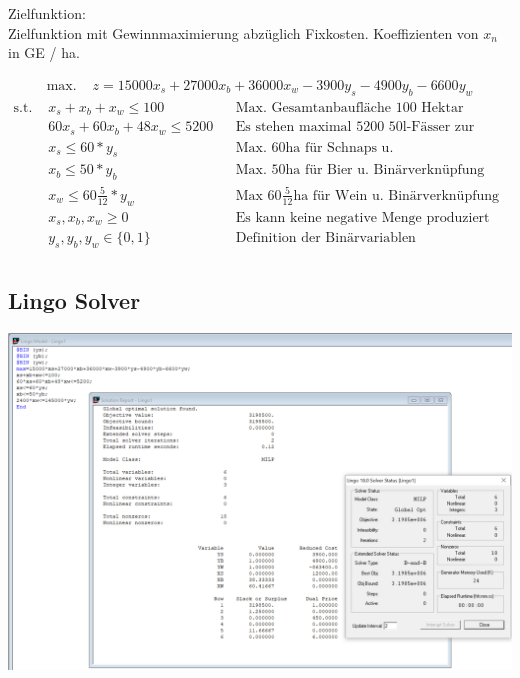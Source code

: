 \documentclass[a4paper,11pt]{article}
\begin{document}
\bigbreak
Zielfunktion: \\
Zielfunktion mit Gewinnmaximierung abzüglich Fixkosten. Koeffizienten von $x_n$ in GE / ha.

\begin{align*}
    \text{max. } & z = 15000x_{s} + 27000x_{b} + 36000x_{w} - 3900y_{s} - 4900y_{b} - 6600y_{w}
\end{align*}
\begin{align*}
    \text{s.t. } & x_{s} + x_{b} + x_{w} \le 100 && \text{Max. Gesamtanbaufläche 100 Hektar} \\
    & 60x_{s} + 60x_{b} + 48x_{w} \le 5200 && \text{Es stehen maximal 5200 50l-Fässer zur Verfügung} \\
    & x_{s} \le 60*y_{s} && \text{Max. 60ha für Schnaps u. Binärverknüpfung} \\
    & x_{b} \le 50*y_{b} && \text{Max. 50ha für Bier u. Binärverknüpfung} \\
    & x_{w} \le 60\frac{5}{12}*y_{w} && \text{Max $60\frac{5}{12}$ha für Wein u. Binärverknüpfung} \\
    & x_{s}, x_{b}, x_{w} \ge 0 && \text{Es kann keine negative Menge produziert werden} \\
    & y_{s}, y_{b}, y_{w} \in \{ 0,1 \} && \text{Definition der Binärvariablen} \\
\end{align*}

\subsection*{Lingo Solver}
\begin{centering}
	\includegraphics[width=1\linewidth]{src/blatt_4_aufgabe_1_loesung_solver.PNG}
\end{centering}
\end{document}
